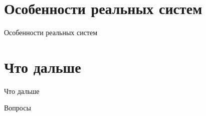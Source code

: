 \documentclass[10pt]{beamer}
\begin{document}

\section{Особенности реальных систем}


\begin{frame}{}

\begin{center}
\Large Особенности реальных систем
\end{center}

\end{frame}


\section{Что дальше}


\begin{frame}{}

\begin{center}
\Large Что дальше
\end{center}

\end{frame}

\begin{frame}{}

\begin{center}
\Large Вопросы
\end{center}

\end{frame}
\end{document}
